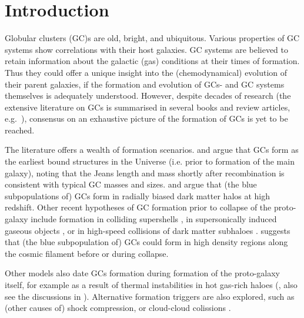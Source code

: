 \documentclass[a4paper,fleqn,usenatbib]{mnras}
\begin{document}


\section{Introduction}
Globular clusters (GC)s are old, bright, and ubiquitous. Various properties of
GC systems show correlations with their host galaxies. GC systems are believed to
retain information about the galactic (gas) conditions at their times of formation.
Thus they could offer a unique insight into the (chemodynamical) evolution of their 
parent galaxies, if the formation and evolution of GCs- and GC systems themselves 
is adequately understood. However, despite decades of research (the extensive 
literature on GCs is summarised in several books and review articles, e.g.~\citealt{
1991ARA&A..29..543H, Harris2001, 2004Natur.427...31W, 2006ARA&A..44..193B, 
2012A&ARv..20...50G, 2014CQGra..31x4006K, 2018RSPSA.47470616F}), consensus on an 
exhaustive picture of the formation of GCs is yet to be reached.

The literature offers a wealth of formation scenarios. \citet{1968ApJ...154..891P}
and \citet{1984ApJ...277..470P} argue that GCs form as the earliest bound
structures in the Universe (i.e. prior to formation of the main galaxy), 
noting that the Jeans length and mass shortly after recombination is consistent
with typical GC masses and sizes. \citet{2005MNRAS.364..367D} and \citet{
2009ApJ...706L.192B} argue that (the blue subpopulations of) GCs form in radially
biased dark matter halos at high redshift. Other recent hypotheses of GC formation 
prior to collapse of the proto-galaxy include formation in colliding supershells 
\citep{2017Ap&SS.362..183R}, in supersonically induced gaseous objects
\citep{2019arXiv190408941C}, or in high-speed collisions of dark matter subhaloes
\citep{2019arXiv190508951M}. \citet{2017MNRAS.472.3120B} suggests
that (the blue subpopulation of) GCs could form in high density regions along
the cosmic filament before or during collapse.

Other models also date GCs formation during formation of the proto-galaxy itself,
for example as a result of thermal instabilities in hot gas-rich haloes 
(\citealt{1985ApJ...298...18F}, also see the discussions in \citealt{
1990ApJ...363..488K}). Alternative formation triggers are also explored, such as 
(other causes of) shock compression, or cloud-cloud colissions \citep[e.g.][]{
1980glcl.conf..301G, 1992ApJ...400..265M, 1994ApJ...429..177H, 1995ApJ...442..618V,
1996ASPC...92..241L, 2001ApJ...560..592C}. 
\end{document}
